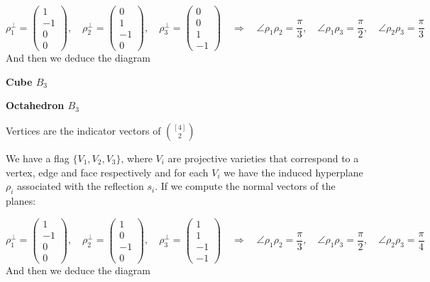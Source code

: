 \documentclass[leqno]{article}
\numberwithin{equation}{section}
\numberwithin{theorem}{section}
\begin{document}
 \[
\rho_1^\perp = \begin{pmatrix} 1\\-1\\0\\0 \end{pmatrix} , \quad
\rho_2^\perp = \begin{pmatrix} 0\\1\\-1\\0 \end{pmatrix} , \quad
\rho_3^\perp = \begin{pmatrix} 0\\0\\1\\-1 \end{pmatrix} \quad
\Rightarrow \quad
\angle \rho_1 \rho _2 = \frac{\pi}{3}, \quad
\angle \rho_1 \rho _3 = \frac{\pi}{2}, \quad
\angle \rho_2 \rho _3 = \frac{\pi}{3}
\] 
And then we deduce the diagram

\textbf{Cube $B_3$}

\textbf{Octahedron $B_3$}

Vertices are the indicator vectors of $\binom{[4]}{2}$

We have a flag $\{V_1, V_2, V_3\}$, where $V_i$ are projective varieties that correspond to a vertex, edge and face respectively and for each  $V_i$ we have the induced hyperplane $\rho_i $ associated with the reflection $s_i$. If we compute the normal vectors of the planes:

 \[
\rho_1^\perp = \begin{pmatrix} 1\\-1\\0\\0 \end{pmatrix} , \quad
\rho_2^\perp = \begin{pmatrix} 1\\0\\-1\\0 \end{pmatrix} , \quad
\rho_3^\perp = \begin{pmatrix} 1\\1\\-1\\-1 \end{pmatrix} \quad
\Rightarrow \quad
\angle \rho_1 \rho _2 = \frac{\pi}{3}, \quad
\angle \rho_1 \rho _3 = \frac{\pi}{2}, \quad
\angle \rho_2 \rho _3 = \frac{\pi}{4}
\] 
And then we deduce the diagram
\end{document}
